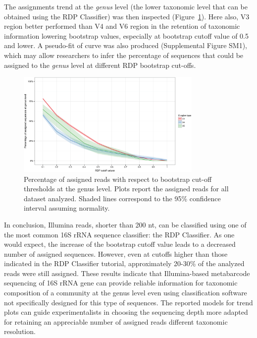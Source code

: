 The assignments trend at the \textit{genus} level (the lower taxonomic level that can be obtained using the RDP Classifier) was then inspected (Figure~\ref{fig:2rdp}).  Here also, V3 region better performed than V4 and V6 region in the retention of taxonomic information lowering bootstrap values, especially at bootstrap cutoff value of 0.5 and lower. A pseudo-fit of curve was also produced (Supplemental Figure SM1), which may allow researchers to infer the percentage of sequences that could be assigned to the \textit{genus} level at different RDP bootstrap cut-offs.\\
\begin{figure}[!tb]
	\centering
	\includegraphics[width=0.8\textwidth]{./figures/Chapter_2/Figure_2}
  	\caption{\label{fig:2rdp}Percentage of assigned reads with respect to bootstrap cut-off thresholds at the genus level. Plots report the assigned reads for all dataset analyzed. Shaded lines correspond to the 95\% confidence interval assuming normality.}
\end{figure}
In conclusion, Illumina reads, shorter than 200 nt, can be classified using one of the most common 16S rRNA sequence classifier: the RDP Classifier. As one would expect, the increase of the bootstrap cutoff value leads to a decreased number of assigned sequences. However, even at cutoffs higher than those indicated in the RDP Classifier tutorial, approximately 20-30\% of the analyzed reads were still assigned. These results indicate that Illumina-based metabarcode sequencing of 16S rRNA gene can provide reliable information for taxonomic composition of a community at the genus level even using classification software not specifically designed for this type of sequences. The reported models for trend plots can guide experimentalists in choosing the sequencing depth more adapted for retaining an appreciable number of assigned reads different taxonomic resolution.\\

